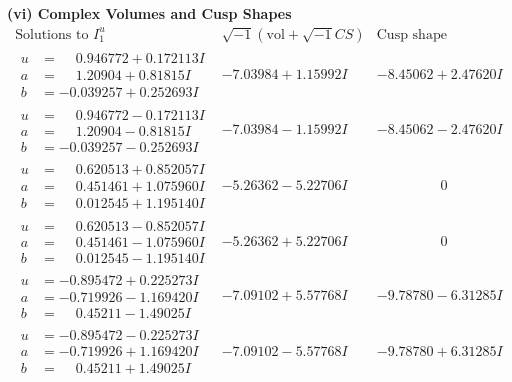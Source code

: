 \documentclass[1p]{elsarticle_modified}
\theoremstyle{definition}
\newcommand{\I}{\sqrt{-1}}
\begin{document}
\newpage\flushleft \textbf{(vi) Complex Volumes and Cusp Shapes}
$$\begin{array}{c|c|c}  
\text{Solutions to }I^u_{1}& \I (\text{vol} + \sqrt{-1}CS) & \text{Cusp shape}\\
 \hline 
\begin{aligned}
u &= \phantom{-}0.946772 + 0.172113 I \\
a &= \phantom{-}1.20904 + 0.81815 I \\
b &= -0.039257 + 0.252693 I\end{aligned}
 & -7.03984 + 1.15992 I & -8.45062 + 2.47620 I \\ \hline\begin{aligned}
u &= \phantom{-}0.946772 - 0.172113 I \\
a &= \phantom{-}1.20904 - 0.81815 I \\
b &= -0.039257 - 0.252693 I\end{aligned}
 & -7.03984 - 1.15992 I & -8.45062 - 2.47620 I \\ \hline\begin{aligned}
u &= \phantom{-}0.620513 + 0.852057 I \\
a &= \phantom{-}0.451461 + 1.075960 I \\
b &= \phantom{-}0.012545 + 1.195140 I\end{aligned}
 & -5.26362 - 5.22706 I & \phantom{-0.000000 } 0 \\ \hline\begin{aligned}
u &= \phantom{-}0.620513 - 0.852057 I \\
a &= \phantom{-}0.451461 - 1.075960 I \\
b &= \phantom{-}0.012545 - 1.195140 I\end{aligned}
 & -5.26362 + 5.22706 I & \phantom{-0.000000 } 0 \\ \hline\begin{aligned}
u &= -0.895472 + 0.225273 I \\
a &= -0.719926 - 1.169420 I \\
b &= \phantom{-}0.45211 - 1.49025 I\end{aligned}
 & -7.09102 + 5.57768 I & -9.78780 - 6.31285 I \\ \hline\begin{aligned}
u &= -0.895472 - 0.225273 I \\
a &= -0.719926 + 1.169420 I \\
b &= \phantom{-}0.45211 + 1.49025 I\end{aligned}
 & -7.09102 - 5.57768 I & -9.78780 + 6.31285 I \\ \hline\begin{aligned}

\end{aligned}
\end{array}$$
\end{document}
